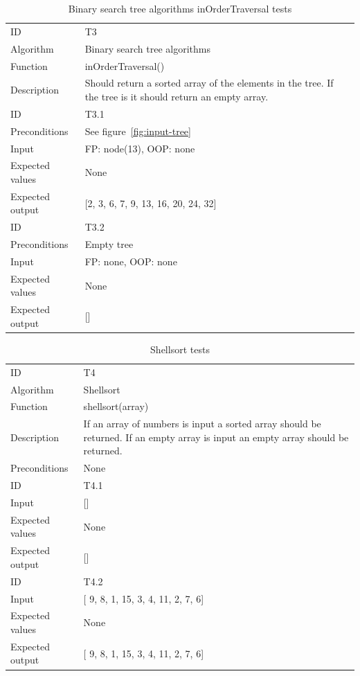 \documentclass {article}
\begin{document}
\begin{table}[H]
\begin{tabular}{ | l p{10cm} | }
\hline
ID & T3 \\
Algorithm & Binary search tree algorithms \\
Function & inOrderTraversal() \\
Description & Should return a sorted array of the elements in the tree. If the tree is it should return an empty array. \\
\hline
ID & T3.1 \\
Preconditions & See figure~\ref{fig:input-tree} \\
Input & FP: node(13), OOP: none \\
Expected values & None \\
Expected output &  [2, 3, 6, 7, 9, 13, 16, 20, 24, 32] \\
\hline
ID & T3.2 \\
Preconditions & Empty tree \\
Input & FP: none, OOP: none \\
Expected values & None \\
Expected output & [] \\
\hline
\end{tabular}
\caption{Binary search tree algorithms inOrderTraversal tests}
\label{tab:traversal-tests}
\end{table}

\begin{table}[H]
\begin{tabular}{ | l p{10cm} | }
\hline
ID & T4 \\
Algorithm & Shellsort \\
Function & shellsort(array) \\
Description & If an array of numbers is input a sorted array should be returned. If an empty array is input an empty array should be returned. \\
Preconditions & None \\
\hline
ID & T4.1 \\
Input & [] \\
Expected values & None \\
Expected output &  [] \\
\hline
ID & T4.2 \\
Input & [ 9, 8, 1, 15, 3, 4, 11, 2, 7, 6] \\
Expected values & None \\
Expected output & [ 9, 8, 1, 15, 3, 4, 11, 2, 7, 6] \\
\hline
\end{tabular}
\caption{Shellsort tests}
\label{tab:shellsort-tests}
\end{table}
\end{document}
